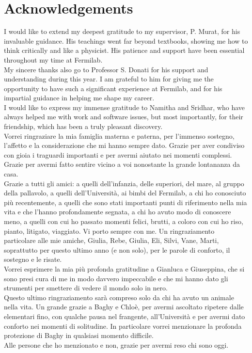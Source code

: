 \chapter*{Acknowledgements}
I would like to extend my deepest gratitude to my supervisor, P. Murat, for his invaluable guidance.
His teachings went far beyond textbooks, showing me how to think critically and like a physicist.
His patience and support have been essential throughout my time at Fermilab.
\vspace{1.5mm}
\\
My sincere thanks also go to Professor S. Donati for his support and understanding during this year.
I am grateful to him for giving me the opportunity to have such a significant experience at Fermilab,
and for his impartial guidance in helping me shape my career.
\vspace{1.5mm}
\\
I would like to express my immense gratitude to Namitha and Sridhar,
who have always helped me with work and software issues, but most importantly,
for their friendship, which has been a truly pleasant discovery.
\vspace{1.5mm}
\\
Vorrei ringraziare la mia famiglia materna e paterna, per l'immenso sostegno, l'affetto e la considerazione che mi hanno sempre dato.
Grazie per aver condiviso con gioia i traguardi importanti e per avermi aiutato nei momenti complessi. Grazie per avermi fatto sentire
vicino a voi nonostante la grande lontananza da casa.
\vspace{1.5mm}
\\
Grazie a tutti gli amici: a quelli dell'infanzia, delle superiori, del mare, al gruppo della pallavolo, a 
quelli dell'Università, ai bimbi del Fermilab, a chi ho conosciuto più
recentemente, a quelli che sono stati importanti punti di riferimento nella mia vita 
e che l'hanno profondamente segnata, a chi ho avuto modo di conoscere meno,
a quelli con cui ho passato momenti felici, brutti, a coloro con cui ho riso, 
pianto, litigato, viaggiato. Vi porto sempre con me.
Un ringraziamento particolare alle mie amiche, Giulia, Rebe, Giulia, Eli, Silvi, 
Vane, Marti, soprattutto per questo ultimo anno (e non solo), per le parole di conforto, il sostegno e le risate.
\vspace{1.5mm}
\\
Vorrei esprimere la mia più profonda gratitudine a Gianluca e Giuseppina,
che si sono presi cura di me in modo davvero impeccabile e 
che mi hanno dato gli strumenti per smettere di vedere il mondo solo in nero.
\vspace{1.5mm}
\\
Questo ultimo ringraziamento sarà compreso solo da chi ha avuto un animale nella vita. Un grande grazie a Baghy e Chloè, per avermi ascoltato ripetere 
dalle elementari fino, con qualche pausa nel frangente, all'Università e per avermi dato conforto nei momenti di solitudine. In particolare vorrei menzionare 
la profonda protezione di Baghy in qualsiasi momento difficile.
\vspace{0.5mm}
\\
Alle persone che ho menzionato e non, grazie per avermi reso chi sono oggi.
\cleardoublepage
